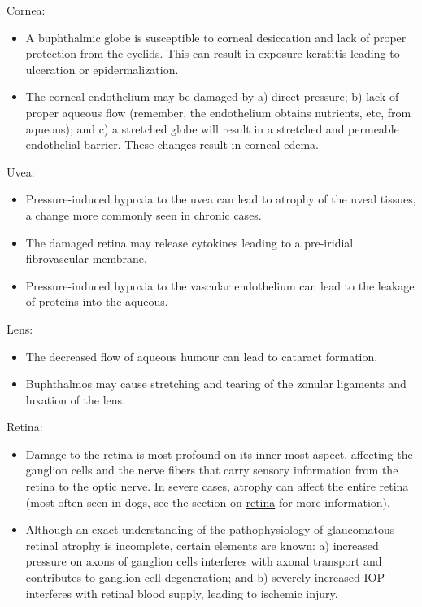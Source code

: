\documentclass[openany]{book}
\providecommand{\tightlist}{%
  \setlength{\itemsep}{0pt}\setlength{\parskip}{0pt}}
\begin{document}
Cornea:

\begin{itemize}
\tightlist
\item
  A buphthalmic globe is susceptible to corneal desiccation and lack of
  proper protection from the eyelids. This can result in exposure
  keratitis leading to ulceration or epidermalization.
\item
  The corneal endothelium may be damaged by a) direct pressure; b) lack
  of proper aqueous flow (remember, the endothelium obtains nutrients,
  etc, from aqueous); and c) a stretched globe will result in a
  stretched and permeable endothelial barrier. These changes result in
  corneal edema.
\end{itemize}

Uvea:

\begin{itemize}
\tightlist
\item
  Pressure-induced hypoxia to the uvea can lead to atrophy of the uveal
  tissues, a change more commonly seen in chronic cases.
\item
  The damaged retina may release cytokines leading to a pre-iridial
  fibrovascular membrane.
\item
  Pressure-induced hypoxia to the vascular endothelium can lead to the
  leakage of proteins into the aqueous.
\end{itemize}

Lens:

\begin{itemize}
\tightlist
\item
  The decreased flow of aqueous humour can lead to cataract formation.
\item
  Buphthalmos may cause stretching and tearing of the zonular ligaments
  and luxation of the lens.
\end{itemize}

Retina:

\begin{itemize}
\tightlist
\item
  Damage to the retina is most profound on its inner most aspect,
  affecting the ganglion cells and the nerve fibers that carry sensory
  information from the retina to the optic nerve. In severe cases,
  atrophy can affect the entire retina (most often seen in dogs, see the
  section on \protect\hyperlink{pathology-of-the-retina}{retina} for
  more information).
\item
  Although an exact understanding of the pathophysiology of glaucomatous
  retinal atrophy is incomplete, certain elements are known: a)
  increased pressure on axons of ganglion cells interferes with axonal
  transport and contributes to ganglion cell degeneration; and b)
  severely increased IOP interferes with retinal blood supply, leading
  to ischemic injury.
\end{itemize}
\end{document}
